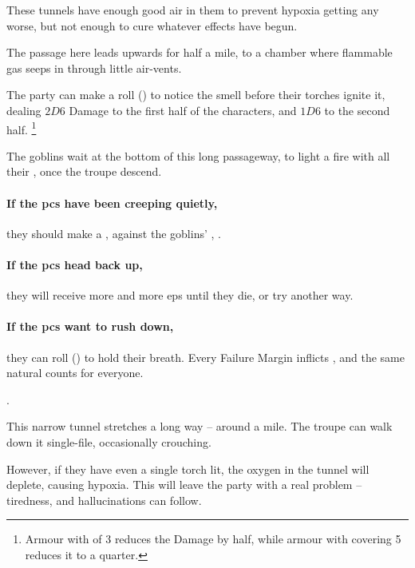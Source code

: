 \begin{multicols}{2}
These tunnels have enough good air in them to prevent \gls{hypoxia} getting any worse, but not enough to cure whatever effects have begun.


The passage here leads upwards for half a mile, to a chamber where flammable gas seeps in through little air-vents.

The party can make a  roll (\tn[12]) to notice the smell before their torches ignite it, dealing $2D6$ Damage to the first half of the characters, and $1D6$ to the second half.%
\footnote{Armour with  of 3 reduces the Damage by half, while armour with \gls{covering} 5 reduces it to a quarter.}



The goblins wait at the bottom of this long passageway, to light a fire with all their \fireFuel, once the troupe descend.

\paragraph{If the \glspl{pc} have been creeping quietly,}
they should make a , against the goblins' , \tn.

\paragraph{If the \glspl{pc} head back up,}
they will receive more and more \glspl{ep} until they die, or try another way.

\paragraph{If the \glspl{pc} want to rush down,}
they can roll  (\tn[10]) to hold their breath.
Every Failure Margin inflicts , and the same \gls{natural} counts for everyone.

.


This narrow tunnel stretches a long way -- around a mile.
The troupe can walk down it single-file, occasionally crouching.

However, if they have even a single torch lit, the oxygen in the tunnel will deplete, causing \gls{hypoxia}.
This will leave the party with a real problem -- tiredness, and hallucinations can follow.


\end{multicols}
